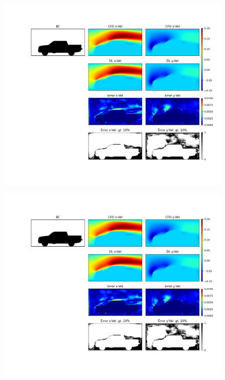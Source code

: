 \documentclass{beamer}
\begin{document}
\begin{frame}
\begin{figure}[!htb]
\begin{minipage}{0.41\textwidth}
{        }
        \includegraphics[width=1.0\linewidth, trim = 11.5cm 3cm 3cm 2.1cm, clip]{../../../plots/plots/cars/errors/montage_test_pred_0.1_10.png}%
    \end{minipage}%
    \hspace{0.1cm}
    \begin{minipage}{0.1\textwidth}%
        \vspace{1.75cm}
        \includegraphics[width=0.49\linewidth, trim = 27.6cm 3cm 1cm 2.1cm, clip]{../../../plots/plots/cars/errors/montage_test_pred_0.1_10.png}%
    \end{minipage}%
\end{figure}
\end{frame}
\end{document}
